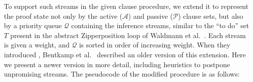 To support such streams in the given clause procedure, we extend it to
represent the proof state not only by the active ($\mathcal{A}$) and passive ($\mathcal{P}$) clause
sets, but also by a priority queue $\mathcal{Q}$ containing the inference streams,
similar to the ``to do'' set $T$ present in the abstract Zipperposition loop of 
Waldmann et al.\  \cite[Sect.~4]{wtrb-20-sat-framework}.
Each stream is given a weight, and $\mathcal{Q}$ is sorted in order of
increasing weight.
When they introduced \lsup, Bentkamp et al.\
\cite{bbtvw-21-sup-lam} described an older version of this extension. Here
we present a newer version in more detail, including heuristics to postpone
unpromising streams. The pseudocode of the modified procedure is as follows:
\newcommand\ParamMode{\ensuremath{K_{\mathrm{fair}}}}
\newcommand\ParamMaxStreams{\ensuremath{K_{\mathrm{best}}}}
\newcommand\ParamRetry{\ensuremath{K_{\mathrm{retry}}}}
\newcommand{\assign}[2]{\State \ensuremath{\mathit{#1} \gets #2}}
\newcommand{\assignSameLine}[2]{\ensuremath{\mathit{#1} \gets #2}}
\algrenewcommand\algorithmicindent{1em}
